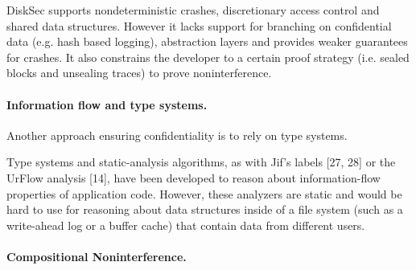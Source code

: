 DiskSec supports nondeterministic crashes, discretionary access control and shared data structures. However it lacks support for branching on confidential data (e.g. hash based logging), abstraction layers and provides weaker guarantees for crashes. It also constrains the developer to a certain proof strategy (i.e. sealed blocks and unsealing traces) to prove noninterference.

\paragraph{Information flow and type systems.} 
Another approach ensuring confidentiality is to rely on type systems. 

Type systems and static-analysis algorithms, as with
Jif’s labels [27, 28] or the UrFlow analysis [14], have been
developed to reason about information-flow properties of
application code. However, these analyzers are static and
would be hard to use for reasoning about data structures
inside of a file system (such as a write-ahead log or a
buffer cache) that contain data from different users.

\paragraph{Compositional Noninterference.} 
	
	
	
	
